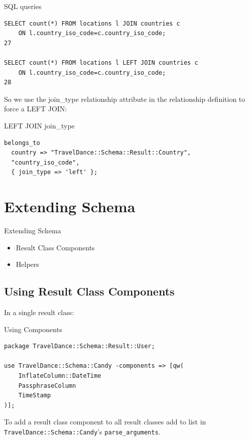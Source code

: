 \begin{frame}[fragile]{SQL queries}
\begin{lstlisting}
SELECT count(*) FROM locations l JOIN countries c
    ON l.country_iso_code=c.country_iso_code;
27

SELECT count(*) FROM locations l LEFT JOIN countries c
    ON l.country_iso_code=c.country_iso_code;
28
\end{lstlisting}
\end{frame}

So we use the join\_type relationship attribute in the relationship definition to force a LEFT JOIN:

\begin{frame}[fragile]{LEFT JOIN join\_type}
\begin{lstlisting}
belongs_to
  country => "TravelDance::Schema::Result::Country",
  "country_iso_code",
  { join_type => 'left' };
\end{lstlisting}
\end{frame}

\section{Extending Schema}
\begin{frame}{Extending Schema}
\begin{itemize}
\item Result Class Components
\item Helpers
\end{itemize}
\end{frame}

\subsection{Using Result Class Components}

In a single result class:

\begin{frame}[fragile]{Using Components}
\begin{lstlisting}
package TravelDance::Schema::Result::User;

use TravelDance::Schema::Candy -components => [qw(
    InflateColumn::DateTime 
    PassphraseColumn
    TimeStamp
)];
\end{lstlisting}
\end{frame}

To add a result class component to all result classes add to list 
in \verb|TravelDance::Schema::Candy|'s \verb|parse_arguments|.

